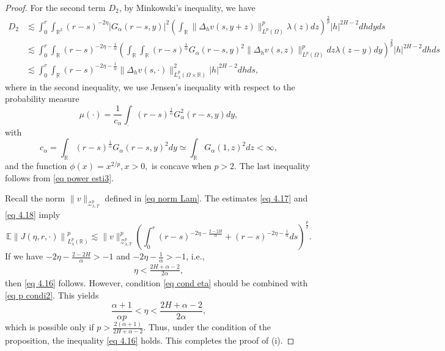 \documentclass[11pt,reqno]{amsart}
\numberwithin{equation}{section}
\newcommand{\1}{{\bf 1}}
\newcommand{\2}{{\bf 2}}
\begin{document}
\begin{proof}
For the second term $D_2$,   by Minkowski's inequality, we have
\begin{align}\label{eq 4.18}
D_2&\lesssim\int_0^r\int_{\mathbb{R}^2}(r-s)^{-2\eta}
|G_{\alpha}(r-s,y)|^2\left( \int_{\mathbb{R}}\|\Delta_hv(s,y+z)\|_{L^p(\Omega)}^p\lambda(z)dz \right)^{\frac{2}{p}}|h|^{2H-2}dhdyds\nonumber\\
&\lesssim  \int_0^r\int_{\mathbb{R}}(r-s)^{-2\eta-\frac{1}{\alpha}}\left(\int_{\mathbb{R}}\int_{\mathbb{R}}(r-s)^{\frac{1}{\alpha}}
G_{\alpha}(r-s,y)^2\|\Delta_hv(s,z)\|_{L^p(\Omega)}^pdz\lambda(z-y)dy\right)^{\frac{2}{p}}|h|^{2H-2}dhds\nonumber\\
&\lesssim  \int_0^r\int_{\mathbb{R}}(r-s)^{-2\eta-\frac{1}{\alpha}}\|\Delta_hv(s,\cdot)\|_{L^p_{\lambda}(\Omega\times\mathbb{R})}^2 |h|^{2H-2}dhds,
\end{align}
where in the second inequality, we use Jensen's inequality  with respect to the probability measure 
$$\mu(\cdot)=\frac{1}{c_{\alpha}}\int_{\cdot}(r-s)^{\frac{1}{\alpha}}G_{\alpha}^2(r-s,y) dy,$$
 with
  $$c_{\alpha}=\int_{\mathbb{R}}(r-s)^{\frac{1}{\alpha}}G_{\alpha}(r-s,y)^2dy\simeq \int_{\mathbb{R}} G_{\alpha}(1,z)^2dz<\infty,$$ 
  and the function $\phi(x)=x^{2/p}, x>0,$ is concave  when $p>2$. The last inequality follows from  \eqref{eq power esti3}.

Recall the norm  $\|v\|_{\mathcal{Z}_{\lambda,T}^p}$ defined in \eqref{eq norm Lam}.   The estimates   \eqref{eq 4.17} and \eqref{eq 4.18} imply
\begin{equation}\label{eq 4.19}
 \mathbb{E}\left\|J(\eta,r,\cdot)\right\|_{L^p_{\lambda}(\mathbb{R})}^p\lesssim \|v\|_{\mathcal{Z}_{\lambda,T}^p}^p\left(\int_0^r(r-s)^{-2\eta-\frac{2-2H}{\alpha}} +(r-s)^{-2\eta-\frac{1}{\alpha}}ds\right)^{\frac{p}2}.
\end{equation}
If we have $-2\eta-\frac{2-2H}{\alpha}>-1$ and $-2\eta-\frac{1}{\alpha}>-1$, i.e.,
\begin{align}\label{eq cond eta}
\eta<\frac{2H+\alpha-2}{2\alpha},
\end{align} 
then \eqref{eq 4.16} follows.
 However,  condition \eqref{eq cond eta} should be combined with \eqref{eq p condi2}. This yields $$\frac{\alpha+1}{\alpha p}<\eta<\frac{2H+\alpha-2}{2\alpha},$$ which is possible only if  $p>\frac{2(\alpha+1)}{2H+\alpha-2}$. Thus, under the condition of the proposition, the inequality \eqref{eq 4.16} holds. This completes the proof of (i).



\end{proof}
\end{document}
